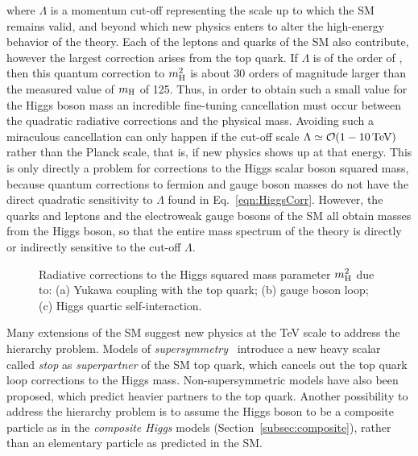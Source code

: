 \noindent where $\Lambda$ is a momentum cut-off representing the scale up to which the SM remains valid, and beyond which new physics enters to alter the high-energy behavior of the theory.
Each of the leptons and quarks of the SM also contribute, however the largest correction arises from the top quark.
If $\Lambda$ is of the order of \MPl, then this quantum correction to $m^2_\mathrm{H}$ is about 30 orders of magnitude larger than the measured value of $m_\mathrm{H}$ of 125\GeV.
Thus, in order to obtain such a small value for the Higgs boson mass an incredible fine-tuning cancellation must occur between the quadratic radiative corrections and the physical mass.
Avoiding such a miraculous cancellation can only happen if the cut-off scale $\Lambda \simeq \mathcal{O}(1 - 10\,\text{Te\hspace{-.08em}V})$ rather than the Planck scale, that is, if new physics shows up at that energy.
This is only directly a problem for corrections to the Higgs scalar boson squared mass, because quantum corrections to fermion and gauge boson masses do not have the direct
quadratic sensitivity to $\Lambda$ found in Eq.~\ref{eqn:HiggsCorr}. However, the quarks and leptons and the electroweak gauge bosons of the SM all obtain masses from the Higgs boson,
so that the entire mass spectrum of the theory is directly or indirectly sensitive to the cut-off $\Lambda$.

\begin{figure}[!htb]
 \centering
 \caption{Radiative corrections to the Higgs squared mass parameter $m^2_\mathrm{H}$ due to: (a) Yukawa coupling with the top quark; (b) gauge boson loop; (c) Higgs quartic self-interaction.}
 \label{fig:HiggsLoop}
\end{figure}

Many extensions of the SM suggest new physics at the TeV scale to address the hierarchy problem.
Models of \textit{supersymmetry}~\cite{PhysRevD.24.1681,Casas:1994qy} introduce a new heavy scalar called \textit{stop} as \textit{superpartner} of the SM top quark,
which cancels out the top quark loop corrections to the Higgs mass. Non-supersymmetric models have also been proposed, which predict heavier partners to the top quark.
Another possibility to address the hierarchy problem is to assume the Higgs boson to be a composite particle as in the \textit{composite Higgs} models (Section~\ref{subsec:composite}),
rather than an elementary particle as predicted in the SM. %


